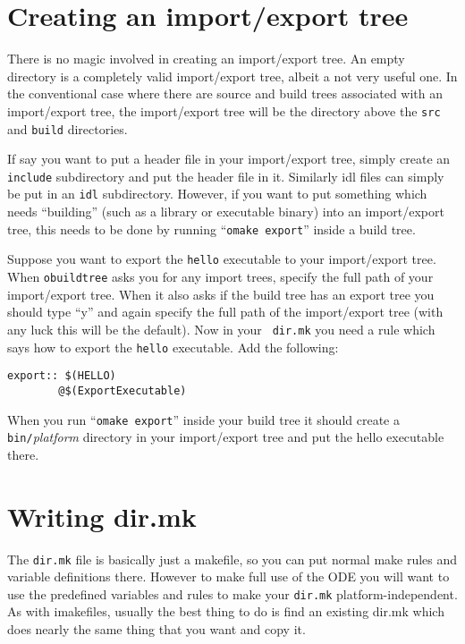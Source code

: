 \documentclass[11pt]{article}
\begin{document}
\section{Creating an import/export tree}

There is no magic involved in creating an import/export tree.  An empty
directory is a completely valid import/export tree, albeit a not very useful
one.  In the conventional case where there are source and build trees
associated with an import/export tree, the import/export tree will be the
directory above the {\tt src} and {\tt build} directories.

If say you want to put a header file in your import/export tree, simply create
an {\tt include} subdirectory and put the header file in it.  Similarly idl
files can simply be put in an {\tt idl} subdirectory.  However, if you want to
put something which needs ``building'' (such as a library or executable binary)
into an import/export tree, this needs to be done by running ``{\tt omake
export}'' inside a build tree.

Suppose you want to export the {\tt hello} executable to your import/export
tree.  When {\tt obuildtree} asks you for any import trees, specify the full
path of your import/export tree.  When it also asks if the build tree has an
export tree you should type ``y'' and again specify the full path of the
import/export tree (with any luck this will be the default).  Now in your {\tt
dir.mk} you need a rule which says how to export the {\tt hello} executable.
Add the following:

\begin{verbatim}
export:: $(HELLO)
        @$(ExportExecutable)
\end{verbatim}

When you run ``{\tt omake export}'' inside your build tree it should create a
{\tt bin/}{\it platform} directory in your import/export tree and put the hello
executable there.


\section{Writing dir.mk}

The {\tt dir.mk} file is basically just a makefile, so you can put normal make
rules and variable definitions there.  However to make full use of the ODE you
will want to use the predefined variables and rules to make your {\tt dir.mk}
platform-independent.  As with imakefiles, usually the best thing to do is find
an existing dir.mk which does nearly the same thing that you want and copy it.
\end{document}
